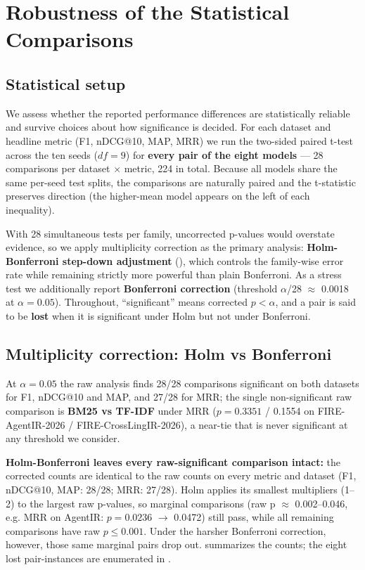 \section{Robustness of the Statistical Comparisons}
\label{sec:rob}

\subsection*{Statistical setup}

We assess whether the reported performance differences are statistically reliable and survive choices about how significance is decided. For each dataset and headline metric (F1, nDCG@10, MAP, MRR) we run the two-sided paired t-test across the ten seeds ($df = 9$) for \textbf{every pair of the eight models} --- 28 comparisons per dataset $\times$ metric, 224 in total. Because all models share the same per-seed test splits, the comparisons are naturally paired and the t-statistic preserves direction (the higher-mean model appears on the left of each inequality).

With 28 simultaneous tests per family, uncorrected p-values would overstate evidence, so we apply multiplicity correction as the primary analysis: \textbf{Holm-Bonferroni step-down adjustment} (\citep{holm1979simple}), which controls the family-wise error rate while remaining strictly more powerful than plain Bonferroni. As a stress test we additionally report \textbf{Bonferroni correction} (threshold $\alpha$/28 $\approx$ 0.0018 at $\alpha = 0.05$). Throughout, ``significant'' means corrected $p < \alpha$, and a pair is said to be \textbf{lost} when it is significant under Holm but not under Bonferroni.

\subsection{Multiplicity correction: Holm vs Bonferroni}
\label{sec:rob-corr}

At $\alpha = 0.05$ the raw analysis finds 28/28 comparisons significant on both datasets for F1, nDCG@10 and MAP, and 27/28 for MRR; the single non-significant raw comparison is \textbf{BM25 vs TF-IDF} under MRR ($p = 0.3351$ / 0.1554 on FIRE-AgentIR-2026 / FIRE-CrossLingIR-2026), a near-tie that is never significant at any threshold we consider.

\textbf{Holm-Bonferroni leaves every raw-significant comparison intact:} the corrected counts are identical to the raw counts on every metric and dataset (F1, nDCG@10, MAP: 28/28; MRR: 27/28). Holm applies its smallest multipliers (1--2) to the largest raw p-values, so marginal comparisons (raw p $\approx$ 0.002--0.046, e.g. MRR on AgentIR: $p = 0.0236$ $\rightarrow$ 0.0472) still pass, while all remaining comparisons have raw $p \leq 0.001$. Under the harsher Bonferroni correction, however, those same marginal pairs drop out.  summarizes the counts; the eight lost pair-instances are enumerated in .

